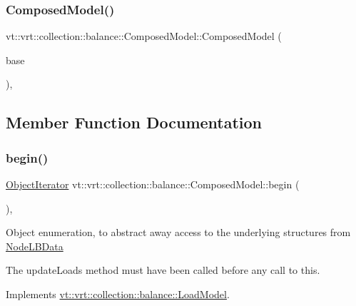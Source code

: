 \subsubsection{\texorpdfstring{Composed\+Model()}{ComposedModel()}}
{\footnotesize\ttfamily vt\+::vrt\+::collection\+::balance\+::\+Composed\+Model\+::\+Composed\+Model (\begin{DoxyParamCaption}\item[{std\+::shared\+\_\+ptr$<$ \hyperlink{structvt_1_1vrt_1_1collection_1_1balance_1_1_load_model}{Load\+Model} $>$}]{base }\end{DoxyParamCaption})\hspace{0.3cm}{\ttfamily [inline]}, {\ttfamily [explicit]}}



\subsection{Member Function Documentation}
\mbox{\label{classvt_1_1vrt_1_1collection_1_1balance_1_1_composed_model_a8f34205887c08a22a1e5bef6ee358f2b}} 
\subsubsection{\texorpdfstring{begin()}{begin()}}
{\footnotesize\ttfamily \hyperlink{structvt_1_1vrt_1_1collection_1_1balance_1_1_object_iterator}{Object\+Iterator} vt\+::vrt\+::collection\+::balance\+::\+Composed\+Model\+::begin (\begin{DoxyParamCaption}{ }\end{DoxyParamCaption})\hspace{0.3cm}{\ttfamily [override]}, {\ttfamily [virtual]}}

Object enumeration, to abstract away access to the underlying structures from \hyperlink{structvt_1_1vrt_1_1collection_1_1balance_1_1_node_l_b_data}{Node\+L\+B\+Data}

The {\ttfamily update\+Loads} method must have been called before any call to this. 

Implements \hyperlink{structvt_1_1vrt_1_1collection_1_1balance_1_1_load_model_a6ca139b4f14d79d1d59b46016efae221}{vt\+::vrt\+::collection\+::balance\+::\+Load\+Model}.



